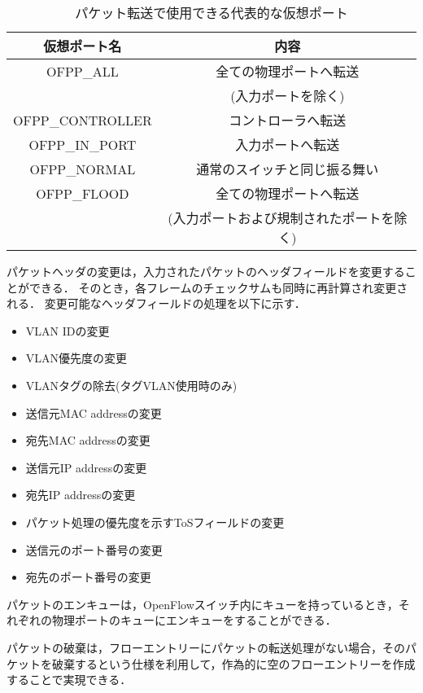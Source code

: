 
\begin{table}[tb]
	\begin{center}
		\caption{パケット転送で使用できる代表的な仮想ポート}
		\begin{tabular}{c|c}
			\hline \hline
			仮想ポート名 & 内容　\\ \hline
			OFPP\_ALL & 全ての物理ポートへ転送　\\
			　& (入力ポートを除く)　\\
			OFPP\_CONTROLLER & コントローラへ転送 \\
			OFPP\_IN\_PORT & 入力ポートへ転送　\\
			OFPP\_NORMAL & 通常のスイッチと同じ振る舞い　\\
			OFPP\_FLOOD & 全ての物理ポートへ転送　\\
			 & (入力ポートおよび規制されたポートを除く) \\ \hline
		\end{tabular}
		\label{tab:2-2}
	\end{center}
\end{table}

パケットヘッダの変更は，入力されたパケットのヘッダフィールドを変更することができる．
そのとき，各フレームのチェックサムも同時に再計算され変更される．
変更可能なヘッダフィールドの処理を以下に示す．

\begin{itemize}
	\item VLAN IDの変更
	\item VLAN優先度の変更
	\item VLANタグの除去(タグVLAN使用時のみ)
	\item 送信元MAC addressの変更
	\item 宛先MAC addressの変更
	\item 送信元IP addressの変更
	\item 宛先IP addressの変更
	\item パケット処理の優先度を示すToSフィールドの変更
	\item 送信元のポート番号の変更
	\item 宛先のポート番号の変更
\end{itemize}

パケットのエンキューは，OpenFlowスイッチ内にキューを持っているとき，それぞれの物理ポートのキューにエンキューをすることができる．

パケットの破棄は，フローエントリーにパケットの転送処理がない場合，そのパケットを破棄するという仕様を利用して，作為的に空のフローエントリーを作成することで実現できる．


